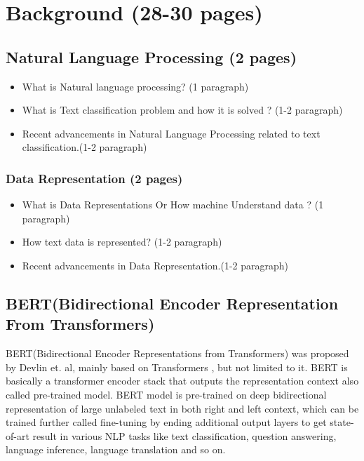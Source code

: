 \documentclass[%
	BCOR=8mm, %
	DIV=12, 
	toc=bibliography, %
	toc=listof, %
	oneside, %
	egregdoesnotlikesansseriftitles, %
	]{scrbook}
\begin{document}
\chapter{Background (28-30 pages)}
\section{Natural Language Processing (2 pages)}

\begin{itemize}
\item What is Natural language processing? (1 paragraph)
\item What is Text classification problem and how it is solved ? (1-2 paragraph)
\item Recent advancements in Natural Language Processing related to text classification.(1-2 paragraph)
\end{itemize}
\subsection{Data Representation (2 pages)}
\begin{itemize}
\item What is Data Representations Or How machine Understand data ? (1 paragraph)
\item How text data is represented? (1-2 paragraph)
\item Recent advancements in Data Representation.(1-2 paragraph)
\end{itemize}
\section{BERT(Bidirectional Encoder Representation From Transformers)}

 BERT(Bidirectional Encoder Representations from Transformers) was proposed by Devlin et$.$ al\cite{devlin_bert_2019}, mainly based on Transformers \cite{vaswani_attention_2017}, but not limited to it. BERT is  basically a transformer encoder stack that outputs the representation context also called pre-trained model. BERT model is pre-trained on deep bidirectional representation of large unlabeled text in both right and left context, which can be trained further called fine-tuning by ending additional output layers to get state-of-art result in various NLP tasks like text classification, question answering, language inference,  language translation and so on. 
 
\end{document}
